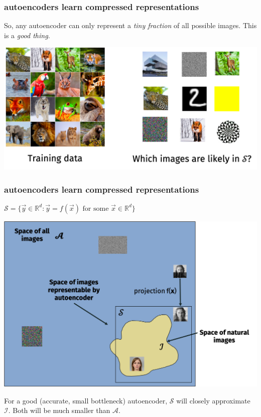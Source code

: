 \documentclass[handout,compress]{beamer}
\newcommand{\R}{\mathbb{R}}
\begin{document}
\begin{frame}
	\frametitle{autoencoders learn compressed representations}
	So, any autoencoder can only represent a \emph{tiny fraction} of all possible images. This is a \emph{good thing}.
	\begin{center}
	\includegraphics[width=.8\textwidth]{encoder_think.png}
	\end{center}
	
\end{frame}

\begin{frame}
	\frametitle{autoencoders learn compressed representations}
	\begin{center}
		$\mathcal{S} = \{\vec{y} \in \R^d: \vec{y} = f(\vec{x}) \text{ for some } \vec{x}\in \R^d\}$
		
		\includegraphics[width=.7\textwidth]{autoencoder_cartoon.png}
	\end{center}
	For a good (accurate, small bottleneck) autoencoder, $\mathcal{S}$ will closely approximate $\mathcal{I}$. Both will be much smaller than $\mathcal{A}$. 
\end{frame}
\end{document}
